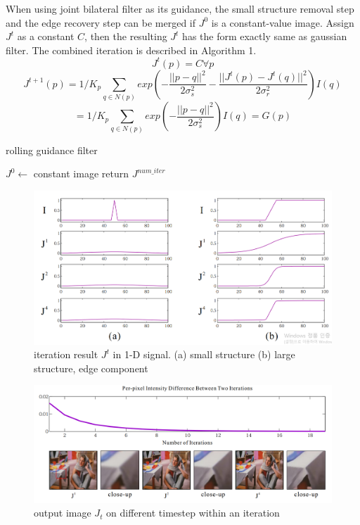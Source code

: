 \documentclass[extendedabs]{bmvc2k}
\begin{document}
When using joint bilateral filter as its guidance, the small structure removal
step and the edge recovery step can be merged if $J^0$ is a constant-value image. 
Assign $J^t$ as a constant $C$, then the resulting $J^t$ has the form exactly 
same as gaussian filter. The combined iteration is described in Algorithm 1.
\[J^t(p) = C \forall p\]
\[J^{t+1}(p) = 1/K_p\sum_{q \in N(p)}exp(-\frac{||p-q||^2}{2\sigma_s^2}-\frac{||J^t(p)-J^t(q)||^2}{2\sigma_r^2})I(q)\]
\[= 1/K_p\sum_{q \in N(p)}exp(-\frac{||p-q||^2}{2\sigma_s^2})I(q) = G(p)\]

\begin{algorithm}
    \caption{rolling guidance filter}
    $J^0 \gets$ constant image\;
    return $J^{num\_iter}$\;
\end{algorithm}

\begin{figure}[h]
    \centering
    \includegraphics[width=\linewidth]{hw2_1_2}
    \caption{iteration result $J^t$ in 1-D signal. (a) small structure 
    (b) large structure, edge component}
    \label{fig:2}
\end{figure}

\begin{figure}[h]
    \centering
    \includegraphics[width=\linewidth]{hw2_1_7}
    \caption{output image $J_t$ on different timestep within an iteration}
    \label{fig:7}
\end{figure}
\end{document}
